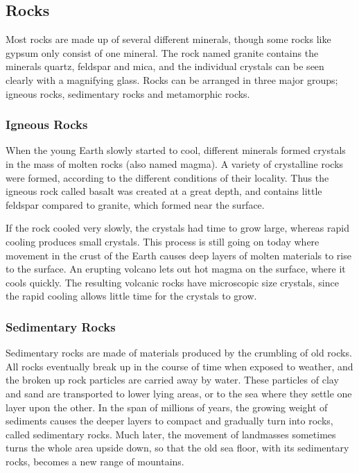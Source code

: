 \subsection{Rocks}
Most rocks are made up of several different minerals, though some rocks like 
gypsum only consist of one mineral. The rock named granite contains the 
minerals quartz, feldspar and mica, and the individual crystals can be seen 
clearly with a magnifying glass. Rocks can be arranged in three major groups; 
igneous rocks, sedimentary rocks and metamorphic rocks.
\subsubsection{Igneous Rocks}
When the young Earth slowly started to cool, different minerals formed crystals 
in the mass of molten rocks (also named magma). A variety of crystalline rocks 
were formed, according to the different conditions of their locality. Thus the 
igneous rock called basalt was created at a great depth, and contains little 
feldspar compared to granite, which formed near the surface.

If the rock cooled very slowly, the crystals had time to grow large, whereas 
rapid cooling produces small crystals. This process is still going on today 
where movement in the crust of the Earth causes deep layers of molten materials 
to rise to the surface. An erupting volcano lets out hot magma on the surface, 
where it cools quickly. The resulting volcanic rocks have microscopic size 
crystals, since the rapid cooling allows little time for the crystals to grow.
\subsubsection{Sedimentary Rocks}
Sedimentary rocks are made of materials produced by the crumbling of old rocks. 
All rocks eventually break up in the course of time when exposed to weather, 
and the broken up rock particles are carried away by water. These particles of 
clay and sand are transported to lower lying areas, or to the sea where they 
settle one layer upon the other. In the span of millions of years, the growing 
weight of sediments causes the deeper layers to compact and gradually turn into 
rocks, called sedimentary rocks. Much later, the movement of landmasses 
sometimes turns the whole area upside down, so that the old sea floor, with its 
sedimentary rocks, becomes a new range of mountains.

